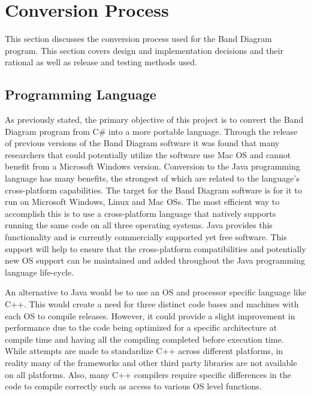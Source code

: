 \documentclass[project]{bsu-ms}
\begin{document}
%
%
\chapter{Conversion Process}\label{ch:conversionProcess}

This section discusses the conversion process used for the Band Diagram program. This section covers design and implementation decisions and their rational as well as release and testing methods used.

\section{Programming Language}\label{sec:programmingLanguage}
As previously stated, the primary objective of this project is to convert the Band Diagram program from C\# into a more portable language. Through the release of previous versions of the Band Diagram software it was found that many researchers that could potentially utilize the software use Mac OS and cannot benefit from a Microsoft Windows version. Conversion to the Java programming language has many benefits, the strongest of which are related to the language's cross-platform capabilities. The target for the Band Diagram software is for it to run on Microsoft Windows, Linux and Mac OSs. The most efficient way to accomplish this is to use a cross-platform language that natively supports running the same code on all three operating systems. Java provides this functionality and is currently commercially supported yet free software. This support will help to ensure that the cross-platform compatibilities and potentially new OS support can be maintained and added throughout the Java programming language life-cycle.

An alternative to Java would be to use an OS and processor specific language like C++. This would create a need for three distinct code bases and machines with each OS to compile releases. However, it could provide a slight improvement in performance due to the code being optimized for a specific architecture at compile time and having all the compiling completed before execution time. While attempts are made to standardize C++ across different platforms, in reality many of the frameworks and other third party libraries are not available on all platforms. Also, many C++ compilers require specific differences in the code to compile correctly such as access to various OS level functions.
\end{document}
